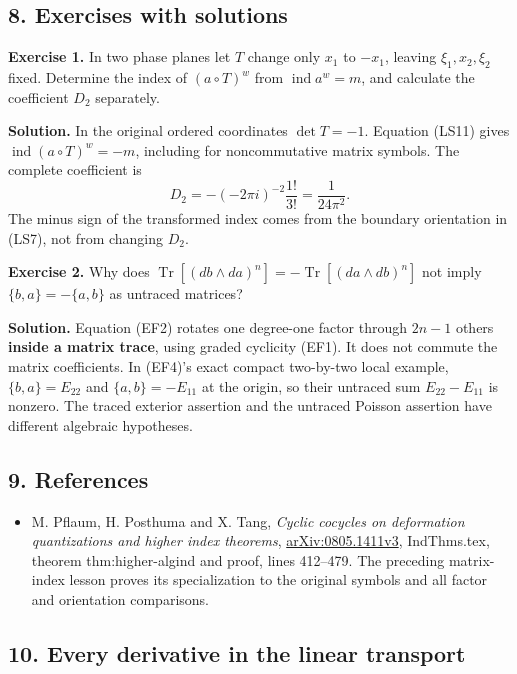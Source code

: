 \documentclass[
  11pt,
]{article}
\providecommand{\tightlist}{%
  \setlength{\itemsep}{0pt}\setlength{\parskip}{0pt}}
\begin{document}
\subsection{8. Exercises with solutions}\label{exercises-with-solutions}

\textbf{Exercise 1.} In two phase planes let \(T\) change only \(x_1\)
to \(-x_1\), leaving \(\xi_1,x_2,\xi_2\) fixed. Determine the index of
\((a\circ T)^w\) from \(\operatorname{ind}a^w=m\), and calculate the
coefficient \(D_2\) separately.

\textbf{Solution.} In the original ordered coordinates \(\det T=-1\).
Equation (LS11) gives \(\operatorname{ind}(a\circ T)^w=-m\), including
for noncommutative matrix symbols. The complete coefficient is \[
 D_2=-(-2\pi i)^{-2}\frac{1!}{3!}
     =\frac{1}{24\pi^2}.
 \tag{LI4}
\] The minus sign of the transformed index comes from the boundary
orientation in (LS7), not from changing \(D_2\).

\textbf{Exercise 2.} Why does
\(\operatorname{Tr}[(db\wedge da)^n]=-\operatorname{Tr}[(da\wedge db)^n]\)
not imply \(\{b,a\}=-\{a,b\}\) as untraced matrices?

\textbf{Solution.} Equation (EF2) rotates one degree-one factor through
\(2n-1\) others \textbf{inside a matrix trace}, using graded cyclicity
(EF1). It does not commute the matrix coefficients. In (EF4)'s exact
compact two-by-two local example, \(\{b,a\}=E_{22}\) and
\(\{a,b\}=-E_{11}\) at the origin, so their untraced sum
\(E_{22}-E_{11}\) is nonzero. The traced exterior assertion and the
untraced Poisson assertion have different algebraic hypotheses.

\subsection{9. References}\label{references}

\begin{itemize}
\tightlist
\item
  M. Pflaum, H. Posthuma and X. Tang, \emph{Cyclic cocycles on
  deformation quantizations and higher index theorems},
  \href{https://arxiv.org/abs/0805.1411}{arXiv:0805.1411v3},
  IndThms.tex, theorem thm:higher-algind and proof, lines 412--479. The
  preceding matrix-index lesson proves its specialization to the
  original symbols and all factor and orientation comparisons.
\end{itemize}

\subsection{10. Every derivative in the linear
transport}\label{every-derivative-in-the-linear-transport}
\end{document}
